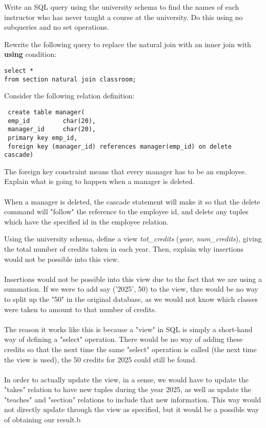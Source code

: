 \documentclass[a4 paper]{article}
\begin{document}
Write an SQL query using the university schema to find the names of each instructor who has never taught a course at the university. Do this using no subqueries and no set operations.


Rewrite the following query to replace the natural join with an inner join with \textbf{using} condition:
\begin{verbatim}
select *
from section natural join classroom;
\end{verbatim}



\color{black}

Consider the following relation definition:
\begin{verbatim}
 create table manager(
 emp_id         char(20),
 manager_id     char(20),
 primary key emp_id,
 foreign key (manager_id) references manager(emp_id) on delete cascade)
\end{verbatim}
The foreign key constraint means that every manager has to be an employee.
Explain what is going to happen when a manager is deleted.\\\\
When a manager is deleted, the cascade statement will make it so that the delete command will "follow" the reference to the employee id, and delete any tuples which have the specified id in the employee relation.



Using the university schema, define a view \emph{tot\_credits} (\emph{year}, \emph{num\_credits}), giving the total number of credits taken in each year. Then, explain why insertions would not be possible into this view.\\\\

Insertions would not be possible into this view due to the fact that we are using a summation. If we were to add say ('2025', 50) to the view, thre would be no way to split up the "50" in the original database, as we would not know which classes were taken to amount to that number of credits.\\\\
The reason it works like this is because a "view" in SQL is simply a short-hand way of defining a "select" operation. There would be no way of adding these credits so that the next time the same "select" operation is called (the next time the view is used), the 50 credits for 2025 could still be found.\\\\
In order to actually update the view, in a sense, we would have to update the "takes" relation to have new tuples during the year 2025, as well as update the "teaches" and "section" relations to include that new information. This way would not directly update through the view as specified, but it would be a possible way of obtaining our result.b
\end{document}
